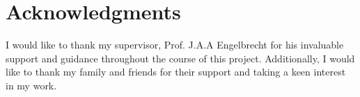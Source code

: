 \chapter*{Acknowledgments}
    I would like to thank my supervisor, Prof. J.A.A Engelbrecht for his invaluable support and guidance throughout the course of this project. Additionally, I would like to thank my family and friends for their support and taking a keen interest in my work.
